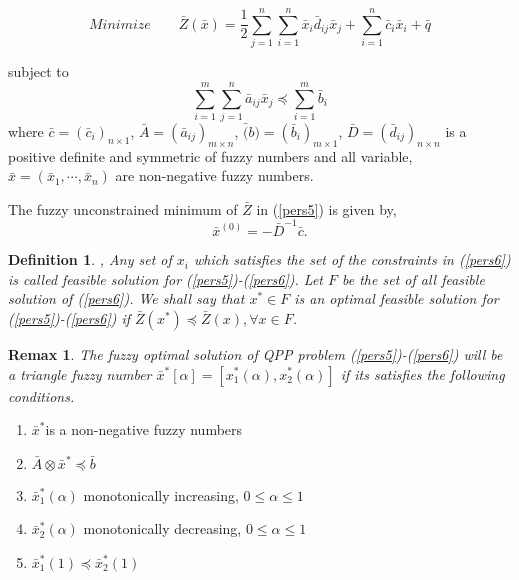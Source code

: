 \documentclass{iaesarticle3}
\newtheorem{definition}{Definition}
\newtheorem{rem}{Remax}
\begin{document}
\begin{equation}\label{pers5}                                             %
    Minimize \qquad \bar{Z}(\bar{x}) = \frac{1}{2} \sum_{j=1}^n \sum_{i=1}^n \bar{x}_i \bar{d}_{ij} \bar{x}_j + \sum_{i=1}^n \bar{c}_i\bar{x}_i + \bar{q}
\end{equation}

subject to
\begin{equation}\label{pers6}                                              %
    \sum_{i=1}^m \sum_{j=1}^n \bar{a}_{ij} \bar{x}_j \preceq \sum_{i=1}^m \bar{b}_i
\end{equation}
where $\bar{c} = (\bar{c}_i)_{n \times 1}$, $\bar{A} = (\bar{a}_{ij})_{m \times n}$, $\bar(b) = (\bar{b}_i)_{m \times 1}$, $\bar{D} = (\bar{d}_{ij})_{n \times n}$ is a positive definite and symmetric of fuzzy numbers and all variable, $\bar{x} = (\bar{x}_1, \cdots, \bar{x}_n)$ are non-negative fuzzy numbers.

The fuzzy unconstrained minimum of $\bar{Z}$ in (\ref{pers5}) is given by,
\begin{equation}\label{pers7}
    \bar{x}^{(0)} = -\bar{D}^{-1} \bar{c}.
\end{equation}

\begin{definition}
      \emph{\cite{mal}}, Any set of $x_i$ which satisfies the set of the constraints in (\ref{pers6}) is called feasible solution for (\ref{pers5})-(\ref{pers6}). Let $F$ be the set  of all feasible solution of (\ref{pers6}). We shall say that $x^* \in F$ is an optimal feasible solution for (\ref{pers5})-(\ref{pers6}) if $\bar{Z}(x^*) \preceq \bar{Z}(x),  \forall x \in F$.
\end{definition}

\begin{rem}
    The fuzzy optimal solution of QPP problem (\ref{pers5})-(\ref{pers6}) will be a triangle fuzzy number $\bar{x}^*[\alpha] = [x_1^*(\alpha), x_2^*(\alpha)]$ if its satisfies the following conditions.
\end{rem}

\begin{enumerate}
  \item $\bar{x}^* $is a non-negative fuzzy numbers
  \item $\bar{A}\otimes \bar{x}^* \preceq \bar{b}$
  \item $\bar{x}_1^*(\alpha)$ monotonically increasing, $0 \leq \alpha \leq 1$
  \item $\bar{x}_2^*(\alpha)$ monotonically decreasing, $0 \leq \alpha \leq 1$
  \item $\bar{x}_1^*(1) \preceq \bar{x}_2^*(1)$
\end{enumerate}
\end{document}
